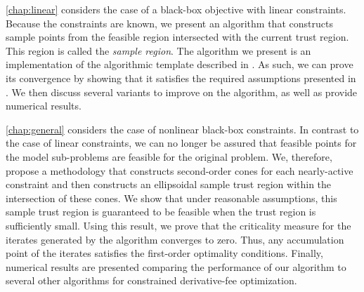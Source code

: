 % 
% 
% 

\cref{chap:linear} considers the case of a black-box objective with linear 
constraints.  
Because the constraints are known, we present an algorithm that constructs sample points from the feasible region intersected with the current trust region.
This region is called the {\em sample region}.
The algorithm we present is an implementation of the algorithmic template described in \cite{Conejo:2013:GCT:2620806.2621814}.
As such, we can prove its convergence by showing that it satisfies the required assumptions presented in \cite{Conejo:2013:GCT:2620806.2621814}.
We then discuss several variants to improve on the algorithm, as well as provide numerical results.

\cref{chap:general} considers the case of nonlinear black-box constraints.
In contrast to the case of linear constraints, we can no longer be assured that feasible points for the model sub-problems are feasible for the original problem.
We, therefore, propose a methodology that constructs second-order cones for each nearly-active constraint and then constructs an ellipsoidal sample trust region within the intersection of these cones.
We show that under reasonable assumptions, this sample trust region is guaranteed to be feasible when the trust region is sufficiently small.
Using this result,  we prove that the criticality measure for the iterates generated by the algorithm converges to zero.
Thus,  any accumulation point of the iterates satisfies the first-order optimality conditions.
Finally, numerical results are presented comparing the performance of our algorithm to several other algorithms for constrained derivative-fee optimization.

